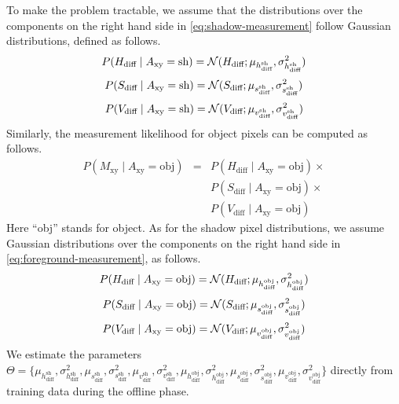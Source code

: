 To make the problem tractable, we assume that the distributions over
the components on the right hand side in \ref{eq:shadow-measurement}
follow Gaussian distributions, defined as follows.
\begin{equation*}
  P(H_{\text{diff}} \mid A_{\text{xy}} = \text{sh}) =
  {\cal N}(H_{\text{diff}} ;
  \mu_{h_{\text{diff}}^{\text{sh}}},
  \sigma^2_{h_{\text{diff}}^{\text{sh}}})
\end{equation*}
\begin{equation*}
  P(S_{\text{diff}} \mid A_{\text{xy}} = \text{sh}) =
  {\cal N}(S_{\text{diff}} ;
  \mu_{s_{\text{diff}}^{\text{sh}}},
  \sigma^2_{s_{\text{diff}}^{\text{sh}}})
\end{equation*}
\begin{equation*}
  P(V_{\text{diff}} \mid A_{\text{xy}} = \text{sh}) =
  {\cal N}(V_{\text{diff}} ;
  \mu_{v_{\text{diff}}^{\text{sh}}},
  \sigma^2_{v_{\text{diff}}^{\text{sh}}})
\end{equation*}
Similarly, the measurement likelihood for object pixels can be
computed as follows.
\begin{equation}
  \label{eq:foreground-measurement}
  \begin{array}{ccl}
    P(M_{\text{xy}} \mid A_{\text{xy}} = \text{obj}) 
            & = & P(H_{\text{diff}} \mid A_{\text{xy}} = \text{obj}) \times \\
            &   & P(S_{\text{diff}} \mid A_{\text{xy}} = \text{obj}) \times \\
            &   & P(V_{\text{diff}} \mid A_{\text{xy}} = \text{obj})
  \end{array}
\end{equation}
Here ``obj'' stands for object. As for the shadow pixel distributions,
we assume Gaussian distributions over the components on the right hand
side in \ref{eq:foreground-measurement}, as follows.
\begin{equation*}
  P(H_{\text{diff}} \mid A_{\text{xy}} = \text{obj}) =
  {\cal N}(H_{\text{diff}} ;
  \mu_{h_{\text{diff}}^{\text{obj}}},
  \sigma^2_{h_{\text{diff}}^{\text{obj}}})
\end{equation*}
\begin{equation*}
  P(S_{\text{diff}} \mid A_{\text{xy}} = \text{obj}) =
  {\cal N}(S_{\text{diff}} ;
  \mu_{s_{\text{diff}}^{\text{obj}}},
  \sigma^2_{s_{\text{diff}}^{\text{obj}}})
\end{equation*}
\begin{equation*}
  P(V_{\text{diff}} \mid A_{\text{xy}} = \text{obj}) =
  {\cal N}(V_{\text{diff}} ;
  \mu_{v_{\text{diff}}^{\text{obj}}},
  \sigma^2_{v_{\text{diff}}^{\text{obj}}})
\end{equation*}
We estimate the parameters $\Theta = \{
\mu_{h_{\text{diff}}^{\text{sh}}},
\sigma^2_{h_{\text{diff}}^{\text{sh}}},
\mu_{s_{\text{diff}}^{\text{sh}}},
\sigma^2_{s_{\text{diff}}^{\text{sh}}},
\mu_{v_{\text{diff}}^{\text{sh}}},
\sigma^2_{v_{\text{diff}}^{\text{sh}}},
\mu_{h_{\text{diff}}^{\text{obj}}},
\sigma^2_{h_{\text{diff}}^{\text{obj}}},
\mu_{s_{\text{diff}}^{\text{obj}}},
\sigma^2_{s_{\text{diff}}^{\text{obj}}},
\mu_{v_{\text{diff}}^{\text{obj}}},
\sigma^2_{v_{\text{diff}}^{\text{obj}}} \}$ directly from training
data during the offline phase.

